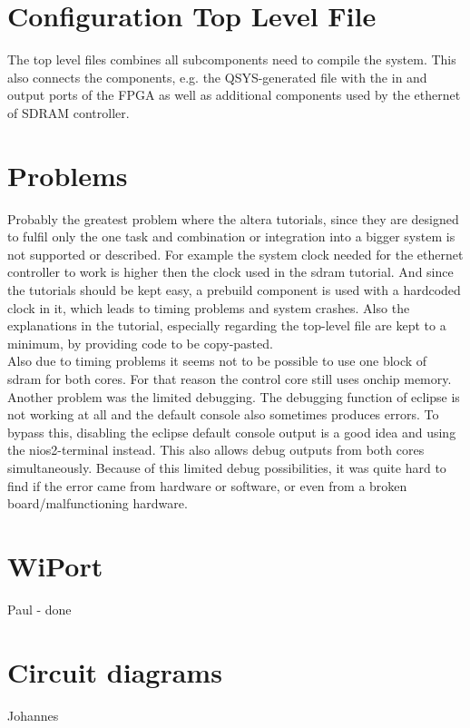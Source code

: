 \section{Configuration Top Level File}
The top level files combines all subcomponents need to compile the system. This also connects the components, e.g. the QSYS-generated file with the in and output ports of the FPGA as well as additional components used by the ethernet of SDRAM controller. 

\section{Problems}
Probably the greatest problem where the altera tutorials, since they are designed to fulfil only the one task and combination or integration into a bigger system is not supported or described. For example the system clock needed for the ethernet controller to work is higher then the clock used in the sdram tutorial. And since the tutorials should be kept easy, a prebuild component is used with a hardcoded clock in it, which leads to timing problems and system crashes. Also the explanations in the tutorial, especially regarding the top-level file are kept to a minimum, by providing code to be copy-pasted.\\
Also due to timing problems it seems not to be possible to use one block of sdram for both cores. For that reason the control core still uses onchip memory.\\
Another problem was the limited debugging. The debugging function of eclipse is not working at all and the default console also sometimes produces errors. To bypass this, disabling the eclipse default console output is a good idea and using the nios2-terminal instead. This also allows debug outputs from both cores simultaneously. Because of this limited debug possibilities, it was quite hard to find if the error came from hardware or software, or even from a broken board/malfunctioning hardware.

\section{WiPort}
Paul - done

\section{Circuit diagrams}
Johannes
